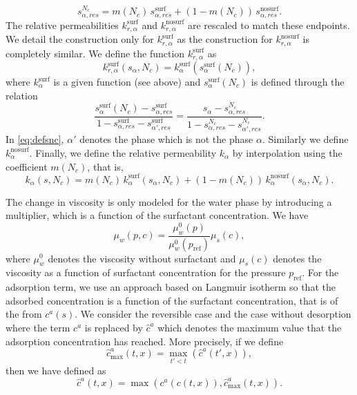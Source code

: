 \documentclass[11pt]{amsart}
\newcommand{\cads}{c^a}
\newcommand{\chatads}{\hat{c}^a}
\newcommand{\pref}{p_\text{ref}}
\newcommand{\surf}{\text{surf}}
\newcommand{\nosurf}{\text{nosurf}}
\begin{document}
\begin{equation}
  \label{eq:srhat}
  s_{\alpha,res}^{N_c} = m(N_c)\,s_{\alpha,res}^{\surf} + (1 - m(N_c))\,s_{\alpha,res}^{\nosurf}.
\end{equation}
The relative permeabilities $k_{r,\alpha}^{\surf}$ and $k_{r,\alpha}^{\nosurf}$
are rescaled to match these endpoints. We detail the construction only for
$k_{r,\alpha}^{\surf}$ as the construction for $k_{r,\alpha}^{\nosurf}$ is
completely similar. We define the function $k_{r,\alpha}^{\surf}$ as
\begin{equation}
\label{eq:rescaledkr}
k_{r,\alpha}^{\surf}(s_\alpha, N_c) = k_\alpha^{\surf}(s_\alpha^{\surf}(N_c)),
\end{equation}
where $k_\alpha^{\surf}$ is a given function (see above) and
$s_\alpha^{\surf}(N_c)$ is defined through the relation
\begin{equation}
  \label{eq:defsnc}
  \frac{s_\alpha^{\surf}(N_c) - s_{\alpha,res}^{\surf}}{1 - s_{\alpha,res}^{\surf} - s_{\alpha',res}^{\surf}} =   \frac{s_\alpha - s_{\alpha,res}^{N_c}}{1 - s_{\alpha,res}^{N_c} - s_{\alpha',res}^{N_c}}.
\end{equation}
In \eqref{eq:defsnc}, $\alpha'$ denotes the phase which is not the phase
$\alpha$. Similarly we define $k_{\alpha}^{\nosurf}$. Finally, we define the
relative permeability $k_{\alpha}$ by interpolation using the coefficient
$m(N_c)$, that is,
\begin{equation}
  \label{eq:defkralpha}
  k_{\alpha}(s, N_c) = m(N_c)\,k_{\alpha}^{\surf}(s_\alpha, N_c) + (1 - m(N_c))\,k_{\alpha}^{\nosurf}(s_\alpha, N_c).
\end{equation}

The change in viscosity is only modeled for the water phase by introducing a
multiplier, which is a function of the surfactant concentration. We have
\begin{equation}
  \label{eq:defmuw}
  \mu_w(p, c) = \frac{\mu_w^0(p)}{\mu_w^0(\pref)}\mu_{s}(c),
\end{equation}
where $\mu_w^0$ denotes the viscosity without surfactant and $\mu_s(c)$ denotes
the viscosity as a function of surfactant concentration for the pressure
$\pref$. For the adsorption term, we use an approach based on Langmuir isotherm
so that the adsorbed concentration is a function of the surfactant
concentration, that is of the from $\cads(s)$. We consider the reversible case
and the case without desorption where the term $\cads$ is replaced by
$\hat\cads$ which denotes the maximum value that the adsorption concentration
has reached. More precisely, if we define
\begin{equation}
  \label{eq:chatadsmax}
  \chatads_{\max}(t,x) = \max_{t'<t}(\chatads(t',x)),
\end{equation}
then we have
defined as
\begin{equation}
  \label{eq:defchatads}
  \chatads(t, x) = \max(\cads(c(t,x)), \chatads_{\max}(t,x)).
\end{equation}
\end{document}
